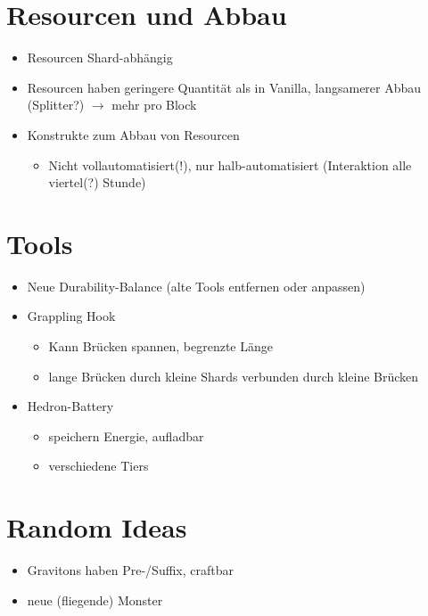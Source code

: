 \documentclass[]{article}
\begin{document}
\section{Resourcen und Abbau}
\begin{itemize}
	\item Resourcen Shard-abhängig
	\item Resourcen haben geringere Quantität als in Vanilla, langsamerer Abbau (Splitter?) $\longrightarrow$ mehr pro Block
	\item Konstrukte zum Abbau von Resourcen
	\begin{itemize}
		\item Nicht vollautomatisiert(!), nur halb-automatisiert (Interaktion alle viertel(?) Stunde)
	\end{itemize}
\end{itemize}

\section{Tools}
\begin{itemize}
	\item Neue Durability-Balance (alte Tools entfernen oder anpassen)
	\item Grappling Hook
	\begin{itemize}
		\item Kann Brücken spannen, begrenzte Länge
		\item lange Brücken durch kleine Shards verbunden durch kleine Brücken
	\end{itemize}
	\item Hedron-Battery
	\begin{itemize}
		\item speichern Energie, aufladbar
		\item verschiedene Tiers
	\end{itemize}
\end{itemize}

\section{Random Ideas}
\begin{itemize}
	\item Gravitons haben Pre-/Suffix, craftbar
	\item neue (fliegende) Monster
\end{itemize}
\end{document}
